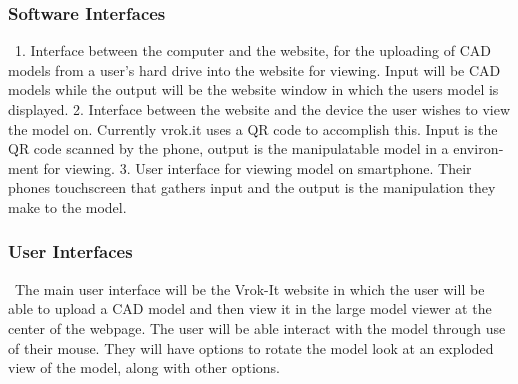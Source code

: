 \documentclass[letterpaper, 10pt, draftclsnofoot, onecolumn]{IEEEtran}
\begin{document}
{\subsubsection[Software
Interfaces]{\rmfamily\bfseries\color{black}
Software Interfaces}
{\color{black}
\foreignlanguage{english}{\ }\foreignlanguage{english}{1.	Interface between the computer and the website, for the uploading of CAD models from a user's hard drive into the website for viewing. Input will be CAD models while the output will be the website window in which the users model is displayed.
2.	Interface between the website and the device the user wishes to view the model on. Currently vrok.it uses a QR code to accomplish this. Input is the QR code scanned by the phone, output is the manipulatable model in a environment for viewing.
3.	User interface for viewing model on smartphone. Their phones touchscreen that gathers input and the output is the manipulation they make to the model.
}}

\subsubsection[User
Interfaces]{\rmfamily\bfseries\color{black}
User Interfaces}
{\color{black}
\foreignlanguage{english}{\ }\foreignlanguage{english}{The main user interface will be the Vrok-It website in which the user will be able to upload a CAD model and then view it in the large model viewer at the center of the webpage. The user will be able interact with the model through use of their mouse. They will have options to rotate the model look at an exploded view of the model, along with other options. }}

\begin{comment}


\subsubsection[Other Communication
Interfaces]{\selectlanguage{english}\rmfamily\bfseries\color{black}
Other Communication Interfaces}
{\selectlanguage{english}\color{black}
\foreignlanguage{english}{\ }\foreignlanguage{english}{[ insert your
text here ]}}







\bigskip


\bigskip


\end{comment}}
\end{document}
